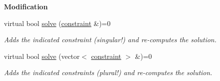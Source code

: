 \begin{Indent}\textbf{ Modification}\par
\begin{DoxyCompactItemize}
\item 
virtual bool \hyperlink{group___c_l_s_solvers_abd84374c52124116becc8924dc74e12d}{solve} (\hyperlink{group___c_l_s_solvers_classconstraint}{constraint} \&)=0
\begin{DoxyCompactList}\small\item\em Adds the indicated constraint (singular!) and re-\/computes the solution. \end{DoxyCompactList}\item 
virtual bool \hyperlink{group___c_l_s_solvers_a35da4bdf5db971c445f495b6eaab072d}{solve} (vector$<$ \hyperlink{group___c_l_s_solvers_classconstraint}{constraint} $>$ \&)=0
\begin{DoxyCompactList}\small\item\em Adds the indicated constraints (plural!) and re-\/computes the solution. \end{DoxyCompactList}\end{DoxyCompactItemize}
\end{Indent}
